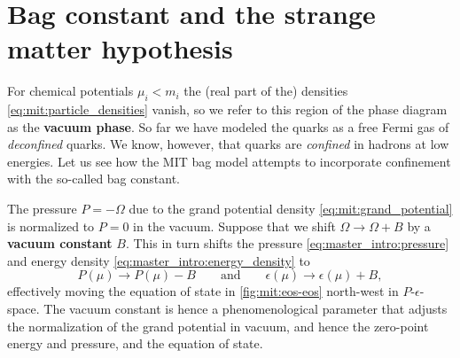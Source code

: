 \section{Bag constant and the strange matter hypothesis}

For chemical potentials $\mu_i < m_i$ the (real part of the) densities \eqref{eq:mit:particle_densities} vanish,
so we refer to this region of the phase diagram as the \textbf{vacuum phase}.
So far we have modeled the quarks as a free Fermi gas of \emph{deconfined} quarks.
We know, however, that quarks are \emph{confined} in hadrons at low energies.
Let us see how the MIT bag model attempts to incorporate confinement with the so-called bag constant.

The pressure $P = -\Omega$ due to the grand potential density \eqref{eq:mit:grand_potential} is normalized to $P = 0$ in the vacuum.
Suppose that we shift $\Omega \rightarrow \Omega + B$ by a \textbf{vacuum constant} $B$.
This in turn shifts the pressure \eqref{eq:master_intro:pressure} and energy density \eqref{eq:master_intro:energy_density} to
\begin{equation}
	P(\mu) \rightarrow P(\mu) - B
	\qquad \text{and} \qquad
	\epsilon(\mu) \rightarrow \epsilon(\mu) + B,
\label{eq:mit:bag_shift}
\end{equation}
effectively moving the equation of state in \cref{fig:mit:eos-eos} north-west in $P$-$\epsilon$-space.
The vacuum constant is hence a phenomenological parameter
that adjusts the normalization of the grand potential in vacuum,
and hence the zero-point energy and pressure, and the equation of state.

